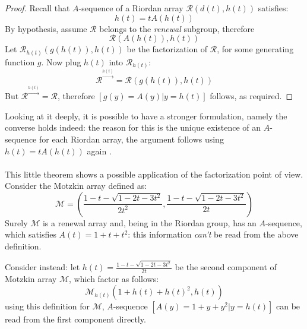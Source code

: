 \documentclass[11pt,a4paper]{article} %
\begin{document}
    \begin{proof}
        Recall that $A$-sequence of a Riordan array $\mathcal{R}\left(d(t), h(t)\right)$
        satisfies:
        \begin{displaymath}
            h(t)=tA(h(t))
        \end{displaymath}
        By hypothesis, assume $\mathcal{R}$ belongs to the \emph{renewal} subgroup, therefore
        \begin{displaymath}
            \mathcal{R}\left(A(h(t)), h(t)\right)
        \end{displaymath}
        Let $\mathcal{R}_{h(t)}\left(g(h(t)), h(t)\right)$ be the factorization of $\mathcal{R}$,
        for some generating function $g$. Now plug $h(t)$ into $\mathcal{R}_{h(t)}$:
        \begin{displaymath}
            \mathcal{R}^{\stackrel{h(t)}{\rightarrow}} =
                \mathcal{R}\left(g(h(t)), h(t)\right)
        \end{displaymath}
        But $\mathcal{R}^{\stackrel{h(t)}{\rightarrow}} = \mathcal{R}$, therefore 
        $[g(y)=A(y)|y=h(t)]$ follows, as required.

    \end{proof}

    Looking at it deeply, it is possible to have a stronger formulation, namely the 
    converse holds indeed: the reason for this is the unique existence of an $A$-sequence
    for each Riordan array, the argument follows using $h(t)=tA(h(t))$ again .
    \\\\
    This little theorem shows a possible application of the factorization point of view.
    Consider the Motzkin array defined as:
    \begin{displaymath} 
        \mathcal{M} =\left( \frac{1-t-\sqrt{1-2t-3t^2}}{2t^2},
           \frac{1-t-\sqrt{1-2t-3t^2}}{2t}  \right)
    \end{displaymath} 
    Surely $\mathcal{M}$ is a renewal array and, being in the Riordan group, 
    has an $A$-sequence, which satisfies $A(t)=1+t+t^2$: 
    this information \emph{can't} be read from the above definition.

    Consider instead: let $h(t)=\frac{1-t-\sqrt{1-2t-3t^2}}{2t}$ be the second
    component of Motzkin array $\mathcal{M}$, which factor as follows:
    \begin{displaymath} 
        \mathcal{M}_{h(t)}\left( 1+h(t)+h(t)^2, h(t) \right) 
    \end{displaymath} 
    using this definition for $\mathcal{M}$, $A$-sequence $[A(y)=1+y+y^2|y=h(t)]$ can
    be read from the first component directly.
\end{document}
